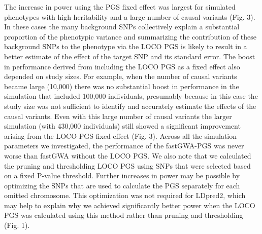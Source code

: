 \documentclass[fleqn,10pt]{wlscirep}
\begin{document}
The increase in power using the PGS fixed effect was largest for simulated phenotypes with high heritability and a large number of causal variants (Fig. 3). In these cases the many background SNPs collectively explain a substantial proportion of the phenotypic variance and summarizing the contribution of these background SNPs to the phenotype via the LOCO PGS is likely to result in a better estimate of the effect of the target SNP and its standard error. The boost in performance derived from including the LOCO PGS as a fixed effect also depended on study sizes. For example, when the number of causal variants became large (10,000) there was no substantial boost in performance in the simulation that included 100,000 individuals, presumably because in this case the study size was not sufficient to identify and accurately estimate the effects of the causal variants. Even with this large number of causal variants the larger simulation (with 430,000 individuals) still showed a significant improvement arising from the LOCO PGS fixed effect (Fig. 3). Across all the simulation parameters we investigated, the performance of the fastGWA-PGS was never worse than fastGWA without the LOCO PGS. We also note that we calculated the pruning and thresholding LOCO PGS using SNPs that were selected based on a fixed P-value threshold. Further increases in power may be possible by optimizing the SNPs that are used to calculate the PGS separately for each omitted chromosome. This optimization was not required for LDpred2, which may help to explain why we achieved significantly better power when the LOCO PGS was calculated using this method rather than pruning and thresholding (Fig. 1).  
\end{document}
